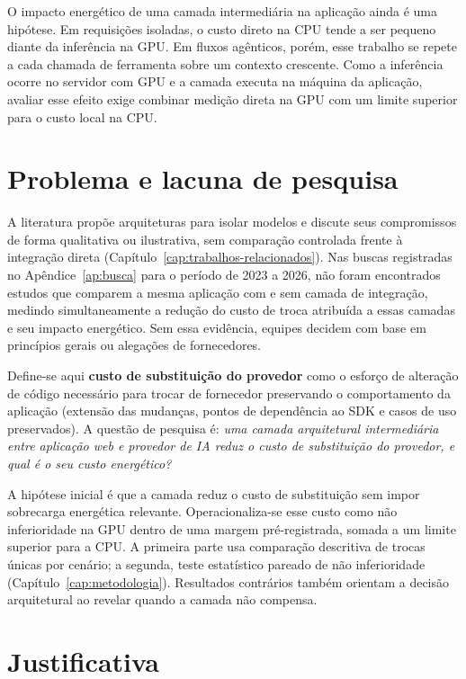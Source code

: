 O impacto energético de uma camada intermediária na aplicação ainda é uma
hipótese. Em requisições isoladas, o custo direto na CPU tende a
ser pequeno diante da inferência na GPU. Em fluxos agênticos, porém, esse
trabalho se repete a cada chamada de ferramenta sobre um contexto crescente.
Como a inferência ocorre no servidor com GPU e a camada executa na máquina da
aplicação, avaliar esse efeito exige combinar medição direta na GPU com um
limite superior para o custo local na CPU.

\section{Problema e lacuna de pesquisa}
\label{sec:problema}

A literatura propõe arquiteturas para isolar modelos e discute seus compromissos
de forma qualitativa ou ilustrativa, sem comparação controlada frente à
integração direta \cite{liu2025,kandogan2025,zhu2026}
(Capítulo~\ref{cap:trabalhos-relacionados}). Nas buscas registradas no
Apêndice~\ref{ap:busca} para o período de 2023 a 2026, não foram encontrados
estudos que comparem a mesma aplicação com e sem camada de integração, medindo
simultaneamente a redução do custo de troca atribuída a essas camadas
\cite{kandogan2025,morais2026} e seu impacto energético. Sem essa evidência,
equipes decidem com base em princípios gerais ou alegações de fornecedores.

Define-se aqui \textbf{custo de substituição do provedor} como o esforço de
alteração de código necessário para trocar de fornecedor preservando o
comportamento da aplicação (extensão das mudanças, pontos de dependência ao SDK
e casos de uso preservados). A questão de pesquisa é: \textit{uma camada
arquitetural intermediária entre aplicação \textit{web} e provedor de IA reduz
o custo de substituição do provedor, e qual é o seu custo energético?}

A hipótese inicial é que a camada reduz o custo de substituição sem impor
sobrecarga energética relevante. Operacionaliza-se esse custo como não
inferioridade na GPU dentro de uma margem pré-registrada, somada a um limite
superior para a CPU. A primeira parte usa comparação descritiva de trocas
únicas por cenário; a segunda, teste estatístico pareado de não inferioridade
(Capítulo~\ref{cap:metodologia}). Resultados contrários também orientam a
decisão arquitetural ao revelar quando a camada não compensa.

\section{Justificativa}
\label{sec:justificativa}

